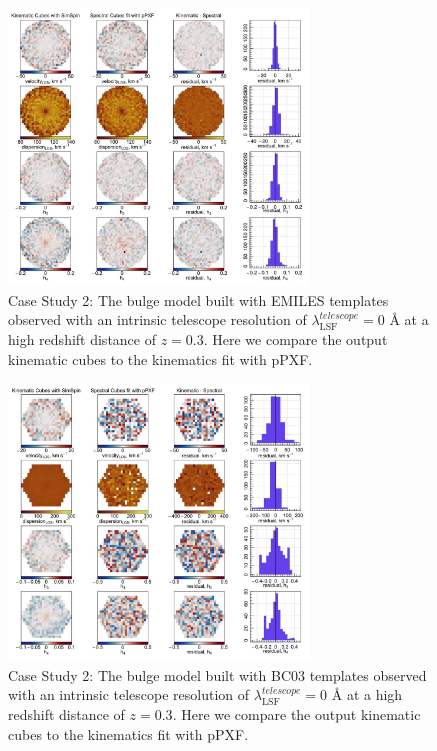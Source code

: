 \documentclass[
  journal=pasa,
  manuscript=research-paper, %
  year=2020,
  volume=37,
]{cup-journal}
\begin{document}
\begin{figure}
    \centering
    \includegraphics[keepaspectratio, width=8cm]{Figures/cs2_bulge_velocities_highz_EMILES.jpeg}
    \caption{Case Study 2: The bulge model built with EMILES templates observed with an intrinsic telescope resolution of  $\lambda_{\text{LSF}}^{telescope} = 0$ \AA{} at a high redshift distance of $z = 0.3$. Here we compare the output kinematic cubes to the kinematics fit with pPXF.}
    \label{fig:cs2_bulge_EMILES}
\end{figure}

\begin{figure}
    \centering
    \includegraphics[keepaspectratio, width=8cm]{Figures/cs2_bulge_velocities_highz_BC03hr.jpeg}
    \caption{Case Study 2: The bulge model built with BC03 templates observed with an intrinsic telescope resolution of  $\lambda_{\text{LSF}}^{telescope} = 0$ \AA{} at a high redshift distance of $z = 0.3$. Here we compare the output kinematic cubes to the kinematics fit with pPXF.}
    \label{fig:cs2_bulge_BC03}
\end{figure}
\end{document}
